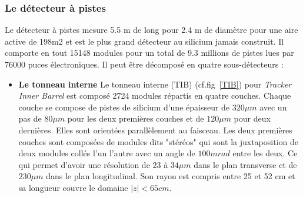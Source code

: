 \subsubsection{Le détecteur à pistes}
Le détecteur à pistes mesure 5.5 m de long pour 2.4 m de diamètre pour une aire active de 198m2 et est le plus grand détecteur au silicium jamais construit. Il comporte en tout 15148 modules pour un total de 9.3 millions de pistes lues par 76000 puces électroniques. Il peut être décomposé en quatre sous-détecteurs :

\begin{itemize}[label=$\bullet$]
\item \textbf{Le tonneau interne} Le tonneau interne (TIB) (cf.fig~\ref{TIB}) pour  \textit{Tracker Inner Barrel} est composé 2724 modules répartis en quatre couches. Chaque couche se compose de pistes de silicium d'une épaisseur de $320 \mu m$ avec un pas de $80 \mu m$ pour les deux premières couches et de $120\mu m$ pour deux dernières. Elles sont orientées parallèlement au faisceau. Les deux premières couches sont composées de modules dits "stéréos" qui sont la juxtaposition de deux modules collés l'un l'autre avec un angle de $100mrad$ entre les deux. Ce qui permet d'avoir une résolution de $23$ à $34\mu m$ dans le plan transverse et de $230\mu m$ dans le plan longitudinal. Son rayon est compris entre 25 et 52 cm et sa longueur couvre le domaine $|z|<65cm$.


\end{itemize}
